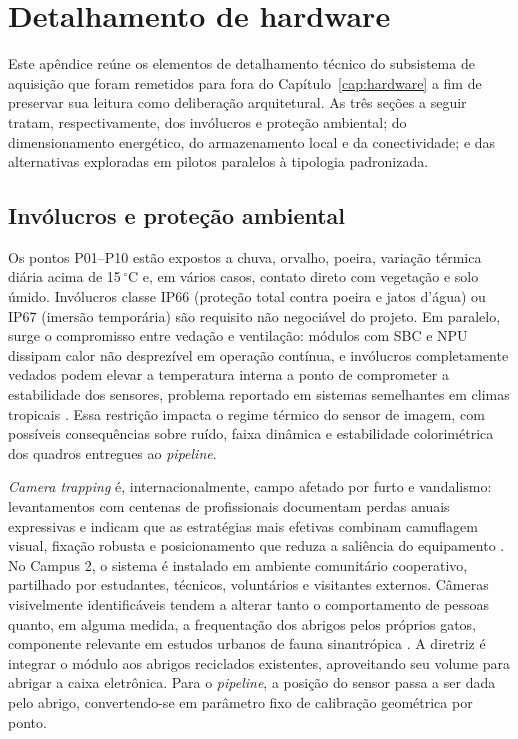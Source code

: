 \chapter{Detalhamento de hardware}
\label{ap:hardware}


Este apêndice reúne os elementos de detalhamento técnico do subsistema de aquisição que foram remetidos para fora do Capítulo~\ref{cap:hardware} a fim de preservar sua leitura como deliberação arquitetural. As três seções a seguir tratam, respectivamente, dos invólucros e proteção ambiental; do dimensionamento energético, do armazenamento local e da conectividade; e das alternativas exploradas em pilotos paralelos à tipologia padronizada.


\section{Invólucros e proteção ambiental}
\label{sec:ap-hw-acondicionamento}


Os pontos P01--P10 estão expostos a chuva, orvalho, poeira, variação térmica diária acima de 15\,$^\circ$C e, em vários casos, contato direto com vegetação e solo úmido. Invólucros classe IP66 (proteção total contra poeira e jatos d'água) ou IP67 (imersão temporária) são requisito não negociável do projeto. Em paralelo, surge o compromisso entre vedação e ventilação: módulos com SBC e NPU dissipam calor não desprezível em operação contínua, e invólucros completamente vedados podem elevar a temperatura interna a ponto de comprometer a estabilidade dos sensores, problema reportado em sistemas semelhantes em climas tropicais \cite{tiddeman2023lowpowerhardware,sargent2021raspberrypi}. Essa restrição impacta o regime térmico do sensor de imagem, com possíveis consequências sobre ruído, faixa dinâmica e estabilidade colorimétrica dos quadros entregues ao \textit{pipeline}.


\textit{Camera trapping} é, internacionalmente, campo afetado por furto e vandalismo: levantamentos com centenas de profissionais documentam perdas anuais expressivas e indicam que as estratégias mais efetivas combinam camuflagem visual, fixação robusta e posicionamento que reduza a saliência do equipamento \cite{meek2018theft}. No Campus 2, o sistema é instalado em ambiente comunitário cooperativo, partilhado por estudantes, técnicos, voluntários e visitantes externos. Câmeras visivelmente identificáveis tendem a alterar tanto o comportamento de pessoas quanto, em alguma medida, a frequentação dos abrigos pelos próprios gatos, componente relevante em estudos urbanos de fauna sinantrópica \cite{cove2022capital}. A diretriz é integrar o módulo aos abrigos reciclados existentes, aproveitando seu volume para abrigar a caixa eletrônica. Para o \textit{pipeline}, a posição do sensor passa a ser dada pelo abrigo, convertendo-se em parâmetro fixo de calibração geométrica por ponto.


